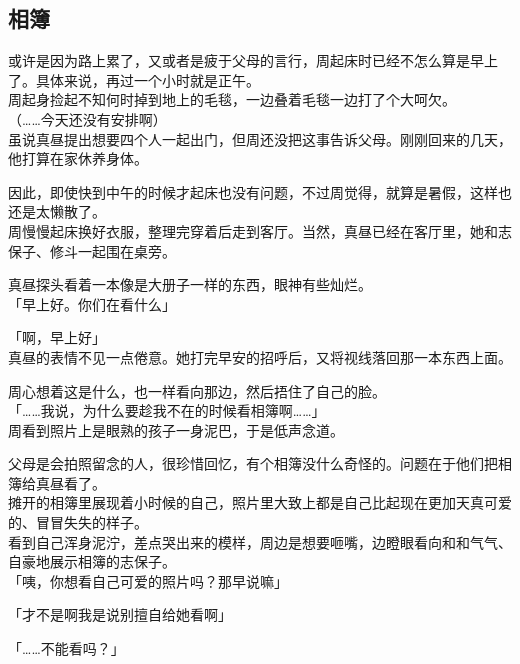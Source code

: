 \subsection{相簿}

或许是因为路上累了，又或者是疲于父母的言行，周起床时已经不怎么算是早上了。具体来说，再过一个小时就是正午。\\

周起身捡起不知何时掉到地上的毛毯，一边叠着毛毯一边打了个大呵欠。\\

（……今天还没有安排啊）\\

虽说真昼提出想要四个人一起出门，但周还没把这事告诉父母。刚刚回来的几天，他打算在家休养身体。

因此，即使快到中午的时候才起床也没有问题，不过周觉得，就算是暑假，这样也还是太懒散了。\\

周慢慢起床换好衣服，整理完穿着后走到客厅。当然，真昼已经在客厅里，她和志保子、修斗一起围在桌旁。

真昼探头看着一本像是大册子一样的东西，眼神有些灿烂。\\

「早上好。你们在看什么」

「啊，早上好」\\

真昼的表情不见一点倦意。她打完早安的招呼后，又将视线落回那一本东西上面。

周心想着这是什么，也一样看向那边，然后捂住了自己的脸。\\

「……我说，为什么要趁我不在的时候看相簿啊……」\\

周看到照片上是眼熟的孩子一身泥巴，于是低声念道。

父母是会拍照留念的人，很珍惜回忆，有个相簿没什么奇怪的。问题在于他们把相簿给真昼看了。\\

摊开的相簿里展现着小时候的自己，照片里大致上都是自己比起现在更加天真可爱的、冒冒失失的样子。\\

看到自己浑身泥泞，差点哭出来的模样，周边是想要咂嘴，边瞪眼看向和和气气、自豪地展示相簿的志保子。\\

「咦，你想看自己可爱的照片吗？那早说嘛」

「才不是啊我是说别擅自给她看啊」

「……不能看吗？」

